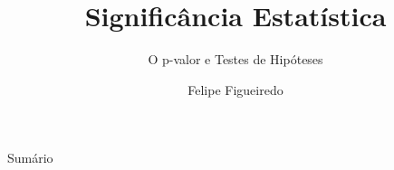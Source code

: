 \documentclass{beamer}
\title[Significância] %
{Significância Estatística}
\subtitle
{O p-valor e Testes de Hipóteses} %
\author%
{Felipe Figueiredo}%
\institute[] %
{
}
\date%
{}
\begin{document}
\begin{frame}
  \titlepage
\end{frame}

\begin{frame}{Sumário}
  \tableofcontents
\end{frame}








\end{document}
